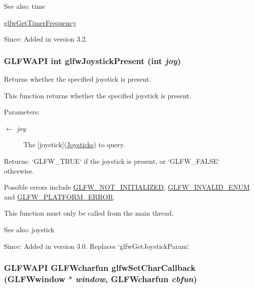 \begin{Desc}
\item[See also:]time 

\hyperlink{group__input_ga92d10b10013372778efbf6367714371}{glfwGetTimerFrequency}\end{Desc}
\begin{Desc}
\item[Since:]Added in version 3.2. \end{Desc}
\hypertarget{group__input_g7f81f22f355f4b7d315caf73cdfd9906}{
\subsubsection[glfwJoystickPresent]{\setlength{\rightskip}{0pt plus 5cm}GLFWAPI int glfwJoystickPresent (int {\em joy})}}
\label{group__input_g7f81f22f355f4b7d315caf73cdfd9906}


Returns whether the specified joystick is present. 

This function returns whether the specified joystick is present.

\begin{Desc}
\item[Parameters:]
\begin{description}
\item[\mbox{$\leftarrow$} {\em joy}]The \mbox{[}joystick\mbox{]}(\hyperlink{group__joysticks}{Joysticks}) to query. \end{description}
\end{Desc}
\begin{Desc}
\item[Returns:]`GLFW\_\-TRUE` if the joystick is present, or `GLFW\_\-FALSE` otherwise.\end{Desc}
Possible errors include \hyperlink{group__errors_g2374ee02c177f12e1fa76ff3ed15e14a}{GLFW\_\-NOT\_\-INITIALIZED}, \hyperlink{group__errors_g76f6bb9c4eea73db675f096b404593ce}{GLFW\_\-INVALID\_\-ENUM} and \hyperlink{group__errors_gd44162d78100ea5e87cdd38426b8c7a1}{GLFW\_\-PLATFORM\_\-ERROR}.

This function must only be called from the main thread.

\begin{Desc}
\item[See also:]joystick\end{Desc}
\begin{Desc}
\item[Since:]Added in version 3.0. Replaces `glfwGetJoystickParam`. \end{Desc}
\hypertarget{group__input_g07b2959b23dc3e466ce7475746021002}{
\subsubsection[glfwSetCharCallback]{\setlength{\rightskip}{0pt plus 5cm}GLFWAPI {\bf GLFWcharfun} glfwSetCharCallback ({\bf GLFWwindow} $\ast$ {\em window}, \/  {\bf GLFWcharfun} {\em cbfun})}}
\label{group__input_g07b2959b23dc3e466ce7475746021002}


